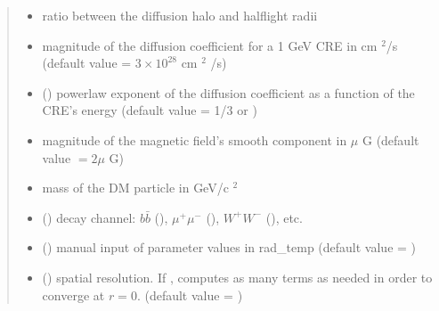 \documentclass[letterpaper,10pt,english]{sphinxmanual}
\begin{document}
\begin{fulllineitems}
\begin{quote}
\begin{description}
\begin{itemize}
\item {} 
\sphinxAtStartPar
{} \textendash{} ratio between the diffusion halo and half\sphinxhyphen{}light radii

\item {} 
\sphinxAtStartPar
{} \textendash{} magnitude of the diffusion coefficient for a 1 GeV CRE in cm \({}^2\)/s (default value = \(3\times 10^{28}\) cm \({}^2\) /s)

\item {} 
\sphinxAtStartPar
{} (\sphinxstyleliteralemphasis{\sphinxupquote{, }}) \textendash{} power\sphinxhyphen{}law exponent of the diffusion coefficient as a function of the CRE’s energy (default value = 1/3 or )

\item {} 
\sphinxAtStartPar
{} \textendash{} magnitude of the magnetic field’s smooth component in \(\mu\) G (default value \(= 2 \mu\) G)

\item {} 
\sphinxAtStartPar
{} \textendash{} mass of the DM particle in GeV/c \({}^2\)

\item {} 
\sphinxAtStartPar
{} () \textendash{} decay channel: \(b\bar b\) (), \(\mu^+ \mu^-\) (), \(W^+ W^-\) (), etc.

\item {} 
\sphinxAtStartPar
{} () \textendash{} manual input of parameter values in rad\_temp (default value = )

\item {} 
\sphinxAtStartPar
{} () \textendash{} spatial resolution. If ,  computes as many terms as needed in order to converge at \(r=0\). (default value = )


\end{itemize}
\end{description}
\end{quote}
\end{fulllineitems}
\end{document}

